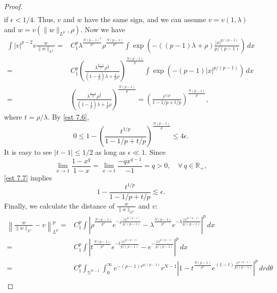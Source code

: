 \documentclass[11pt]{article}
\newcommand{\R}{\mathbb{R}}
\numberwithin{equation}{section}
\begin{document}
\begin{proof}
\begin{equation}
\begin{aligned}
        \end{aligned}
    \end{equation}
    if $\epsilon<1/4$. Thus, $v$ and $w$ have the same sign, and we can assume $v=v(1,\lambda)$ and $w = v(\|w\|_{L^p},\rho)$. Now we have
    \begin{align*}
        \int |v|^{p-2}v\frac{w}{\|w\|_{L^p}} ={}& C_1^p \lambda^{\frac{N(p-1)^2}{p^2}}\rho^{\frac{N(p-1)}{p^2}}\int \exp\left(-((p-1)\lambda+\rho)\frac{|x|^{p/(p-1)}}{p/(p-1)}\right) \,dx\\
        ={}& C_1^p \left(\frac{\lambda^{\frac{p-1}{p}}\rho^{\frac 1p}}{(1-\frac 1p)\lambda + \frac 1p \rho}\right)^{\frac{N(p-1)}{p}} \int \exp\left(-(p-1)|x|^{p/(p-1)}\right)\,dx \\
        ={}& \left(\frac{\lambda^{\frac{p-1}{p}}\rho^{\frac 1p}}{(1-\frac 1p)\lambda + \frac 1p \rho}\right)^{\frac{N(p-1)}{p}} = \left(\frac{t^{1/p}}{1-1/p + t/p}\right)^{\frac{N(p-1)}{p}},
    \end{align*}
    where $t = \rho/\lambda$. By \eqref{est 7.6},
    \begin{equation}\label{est 7.7}
        0 \le 1 - \left(\frac{t^{1/p}}{1-1/p + t/p}\right)^{\frac{N(p-1)}{p}} \le 4\epsilon.
    \end{equation}
    It is easy to see $|t-1|\le 1/2$ as long as $\epsilon \ll 1$. Since
    \begin{equation*}
        \lim_{x\to 1} \frac{1-x^q}{1-x} = \lim_{x\to 1} \frac{-qx^{q-1}}{-1} = q>0,\quad \forall\, q\in \R_+,
    \end{equation*}
    \eqref{est 7.7} implies
    \begin{equation}\label{est 7.8}
        1- \frac{t^{1/p}}{1-1/p + t/p} \lesssim \epsilon.
    \end{equation}
    Finally, we calculate the distance of $\frac{w}{\|w\|_{L^p}}$ and $v$:
    \begin{align*}
        \left\|\frac{w}{\|w\|_{L^p}}-v\right\|_{L^p}^p ={}& C_1^p \int \left|\rho^{\frac{N(p-1)}{p^2}}e^{-\rho\frac{|x|^{p/(p-1)}}{p/(p-1)}}-\lambda^{\frac{N(p-1)}{p^2}}e^{-\lambda\frac{|x|^{p/(p-1)}}{p/(p-1)}}\right|^p\,dx \\
        ={}& C_1^p \int \left|t^{\frac{N(p-1)}{p^2}}e^{-t\frac{|x|^{p/(p-1)}}{p/(p-1)}}-e^{-\frac{|x|^{p/(p-1)}}{p/(p-1)}}\right|^p\,dx\\
        ={}& C_1^p \int_{\mathbb{S}^{N-1}}\int_0^\infty e^{-(p-1)r^{p/(p-1)}}r^{N-1} \left|1-t^{\frac{N(p-1)}{p^2}}e^{(1-t)\frac{r^{p/(p-1)}}{p/(p-1)}}\right|^p\,drd\theta\\

\end{align*}
\end{proof}
\end{document}
